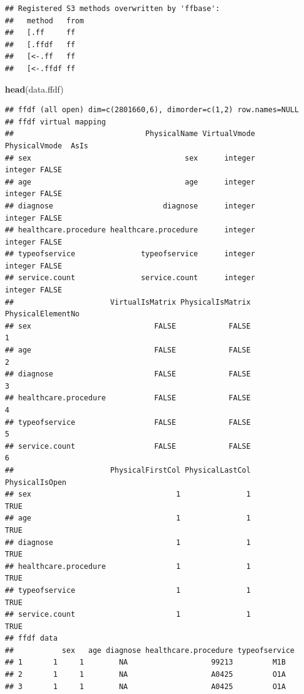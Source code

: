 \documentclass[]{book}
\newenvironment{Shaded}{\begin{snugshade}}{\end{snugshade}}
\newcommand{\KeywordTok}[1]{\textcolor[rgb]{0.13,0.29,0.53}{\textbf{#1}}}
\newcommand{\NormalTok}[1]{#1}
\theoremstyle{definition}
\theoremstyle{definition}
\theoremstyle{definition}
\theoremstyle{remark}
\begin{document}
\begin{verbatim}
## Registered S3 methods overwritten by 'ffbase':
##   method   from
##   [.ff     ff  
##   [.ffdf   ff  
##   [<-.ff   ff  
##   [<-.ffdf ff
\end{verbatim}

\begin{Shaded}
\begin{Highlighting}[]
\KeywordTok{head}\NormalTok{(data.ffdf)}
\end{Highlighting}
\end{Shaded}

\begin{verbatim}
## ffdf (all open) dim=c(2801660,6), dimorder=c(1,2) row.names=NULL
## ffdf virtual mapping
##                              PhysicalName VirtualVmode PhysicalVmode  AsIs
## sex                                   sex      integer       integer FALSE
## age                                   age      integer       integer FALSE
## diagnose                         diagnose      integer       integer FALSE
## healthcare.procedure healthcare.procedure      integer       integer FALSE
## typeofservice               typeofservice      integer       integer FALSE
## service.count               service.count      integer       integer FALSE
##                      VirtualIsMatrix PhysicalIsMatrix PhysicalElementNo
## sex                            FALSE            FALSE                 1
## age                            FALSE            FALSE                 2
## diagnose                       FALSE            FALSE                 3
## healthcare.procedure           FALSE            FALSE                 4
## typeofservice                  FALSE            FALSE                 5
## service.count                  FALSE            FALSE                 6
##                      PhysicalFirstCol PhysicalLastCol PhysicalIsOpen
## sex                                 1               1           TRUE
## age                                 1               1           TRUE
## diagnose                            1               1           TRUE
## healthcare.procedure                1               1           TRUE
## typeofservice                       1               1           TRUE
## service.count                       1               1           TRUE
## ffdf data
##           sex   age diagnose healthcare.procedure typeofservice
## 1       1     1        NA                   99213         M1B  
## 2       1     1        NA                   A0425         O1A  
## 3       1     1        NA                   A0425         O1A  

\end{verbatim}
\end{document}
